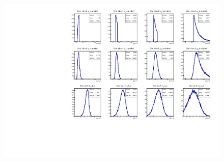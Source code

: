 \documentclass[a4paper,11pt,twoside]{article}
\begin{document}
\begin{figure}[h!]
\includegraphics[height=10.0cm]{figs/sim_t_n_Incoh.pdf}
\caption{}
\label{fig:fermi}
\end{figure}
\end{document}
